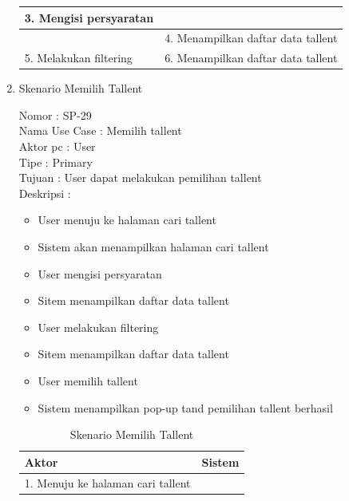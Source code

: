 \begin{enumerate}
\begin{table}
\begin{tabular}{ | l | p{60mm}|}
		\hline
		
		3. Mengisi persyaratan & \\
		
		\hline
		
		& 4. Menampilkan daftar data tallent \\
		\hline
		
		5. Melakukan filtering
		
		& 6. Menampilkan daftar data tallent \\
		\hline
		
	\end{tabular}
\end{table}

\item Skenario Memilih Tallent

Nomor \kern 3.6pc : SP-29 \\
Nama Use Case : Memilih tallent \\
Aktor  pc : User \\
Tipe \kern 4.6pc : Primary \\
Tujuan \kern 3.6pc : User dapat melakukan pemilihan tallent \\
Deskripsi \kern 2.5pc : 

\begin{itemize}
	\item User menuju ke halaman cari tallent
	\item Sistem akan menampilkan halaman cari tallent
	\item User mengisi persyaratan
	\item Sitem menampilkan daftar data tallent
	\item User melakukan filtering
	\item Sitem menampilkan daftar data tallent
	\item User memilih tallent
	\item Sistem menampilkan pop-up tand pemilihan tallent berhasil
	
\end{itemize}

\begin{table}
	\caption{Skenario Memilih Tallent}
	\centering
	\begin{tabular}{ | l | p{60mm}|}
		\hline 
		\textbf{Aktor} & \textbf{Sistem} \\
		\hline
		
		1.	Menuju ke halaman cari tallent &  \\
		
		\hline
		

\end{tabular}
\end{table}
\end{enumerate}
